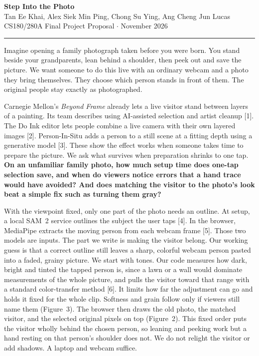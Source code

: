 \documentclass[10pt,letterpaper]{article}
\begin{document}
{\LARGE\bfseries Step Into the Photo}\\[3pt]
{\small Tan Ee Khai, Alex Siek Min Ping, Chong Su Ying, Ang Cheng Jun Lucas\\
CS180/280A Final Project Proposal \quad$\cdot$ November 2026}

\vspace{2pt}\hrule\vspace{5pt}

Imagine opening a family photograph taken before you were born. You stand beside your grandparents, lean behind a shoulder, then peek out and save the picture. We want someone to do this live with an ordinary webcam and a photo they bring themselves. They choose which person stands in front of them. The original people stay exactly as photographed.

Carnegie Mellon's \emph{Beyond Frame} already lets a live visitor stand between layers of a painting. Its team describes using AI-assisted selection and artist cleanup [1]. The Do Ink editor lets people combine a live camera with their own layered images [2]. Person-In-Situ adds a person to a still scene at a fitting depth using a generative model [3]. These show the effect works when someone takes time to prepare the picture. We ask what survives when preparation shrinks to one tap. \textbf{On an unfamiliar family photo, how much setup time does one-tap selection save, and when do viewers notice errors that a hand trace would have avoided? And does matching the visitor to the photo's look beat a simple fix such as turning them gray?}

With the viewpoint fixed, only one part of the photo needs an outline. At setup, a local SAM~2 service outlines the subject the user taps [4]. In the browser, MediaPipe extracts the moving person from each webcam frame [5]. Those two models are inputs. The part we write is making the visitor belong. Our working guess is that a correct outline still leaves a sharp, colorful webcam person pasted into a faded, grainy picture. We start with tones. Our code measures how dark, bright and tinted the tapped person is, since a lawn or a wall would dominate measurements of the whole picture, and pulls the visitor toward that range with a standard color-transfer method [6]. It limits how far the adjustment can go and holds it fixed for the whole clip. Softness and grain follow only if viewers still name them (Figure~3). The browser then draws the old photo, the matched visitor, and the selected original pixels on top (Figure~2). This fixed order puts the visitor wholly behind the chosen person, so leaning and peeking work but a hand resting on that person's shoulder does not. We do not relight the visitor or add shadows. A laptop and webcam suffice.
\end{document}
